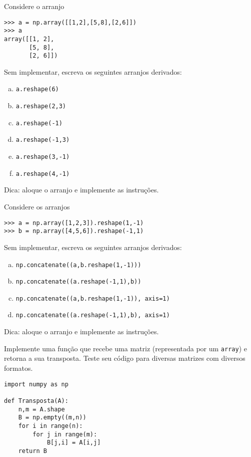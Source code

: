 \begin{exer}
  Considere o arranjo
\begin{lstlisting}
>>> a = np.array([[1,2],[5,8],[2,6]])
>>> a
array([[1, 2],
       [5, 8],
       [2, 6]])
\end{lstlisting}
  Sem implementar, escreva os seguintes arranjos derivados:
  \begin{enumerate}[a)]
  \item \lstinline+a.reshape(6)+
  \item \lstinline+a.reshape(2,3)+
  \item \lstinline+a.reshape(-1)+
  \item \lstinline+a.reshape(-1,3)+
  \item \lstinline+a.reshape(3,-1)+
  \item \lstinline+a.reshape(4,-1)+
  \end{enumerate}
\end{exer}
\begin{resp}
  Dica: aloque o arranjo e implemente as instruções.
\end{resp}

\begin{exer}
  Considere os arranjos
\begin{lstlisting}
>>> a = np.array([1,2,3]).reshape(1,-1)
>>> b = np.array([4,5,6]).reshape(-1,1)
\end{lstlisting}
  Sem implementar, escreva os seguintes arranjos derivados:
  \begin{enumerate}[a)]
  \item \lstinline+np.concatenate((a,b.reshape(1,-1)))+
  \item \lstinline+np.concatenate((a.reshape(-1,1),b))+
  \item \lstinline+np.concatenate((a,b.reshape(1,-1)), axis=1)+
  \item \lstinline+np.concatenate((a.reshape(-1,1),b), axis=1)+
  \end{enumerate}
\end{exer}
\begin{resp}
  Dica: aloque o arranjo e implemente as instruções.
\end{resp}

\begin{exer}
  Implemente uma função que recebe uma matriz (representada por um \lstinline+array+) e retorna a sua transposta. Teste seu código para diversas matrizes com diversos formatos.
\end{exer}
\begin{resp}
\begin{lstlisting}
import numpy as np

def Transposta(A):
    n,m = A.shape
    B = np.empty((m,n))
    for i in range(n):
        for j in range(m):
            B[j,i] = A[i,j]
    return B
\end{lstlisting}
\end{resp}

